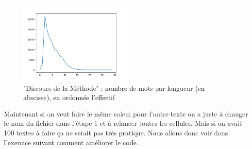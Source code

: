 \begin{figure}
\centering{}
\includegraphics[width=0.5\textwidth]{images/TD1_effectifs1.png}
\caption{"Discours de la Méthode" : nombre de mots par longueur (en abscisse),
en ordonnée l'effectif}
\end{figure}

Maintenant si on veut faire le même calcul pour l'autre texte on a
juste à changer le nom du fichier dans l'étape 1 et à relancer toutes
les cellules. Mais si on avait 100 textes à faire ça ne serait pas
très pratique. Nous allons donc voir dans l'exercice suivant comment
améliorer le code.
